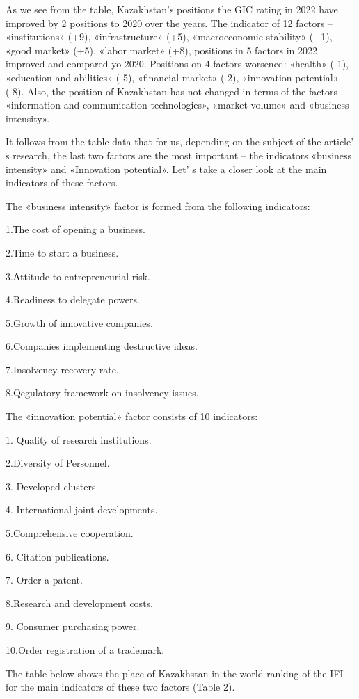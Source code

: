 As we see from the table, Kazakhstan's positions the GIC rating in 2022
have improved by 2 positions to 2020 over the years. The indicator of 12
factors -- «institutions» (+9), «infrastructure» (+5), «macroeconomic
stability» (+1), «good market» (+5), «labor market» (+8), positions in 5
factors in 2022 improved and compared yo 2020. Positions on 4 factors
worsened: «health» (-1), «education and abilities» (-5), «financial
market» (-2), «innovation potential» (-8). Also, the position of
Kazakhstan has not changed in terms of the factors «information and
communication technologies», «market volume» and «business intensity».

It follows from the table data that for us, depending on the subject of
the article' s research, the last two factors are the
most important -- the indicators «business intensity» and «Innovation
potential». Let' s take a closer look at the main
indicators of these factors.

The «business intensity» factor is formed from the following indicators:

1.Тhe cost of opening a business.

2.Тime to start a business.

3.Аttitude to entrepreneurial risk.

4.Readiness to delegate powers.

5.Growth of innovative companies.

6.Companies implementing destructive ideas.

7.Insolvency recovery rate.

8.Qegulatory framework on insolvency issues.

The «innovation potential» factor consists of 10 indicators:

1. Quality of research institutions.

2.Diversity of Personnel.

3. Developed clusters.

4. International joint developments.

5.Comprehensive cooperation.

6. Citation publications.

7. Order a patent.

8.Research and development costs.

9. Consumer purchasing power.

10.Order registration of a trademark.

The table below shows the place of Kazakhstan in the world ranking of
the IFI for the main indicators of these two factors (Table 2).


